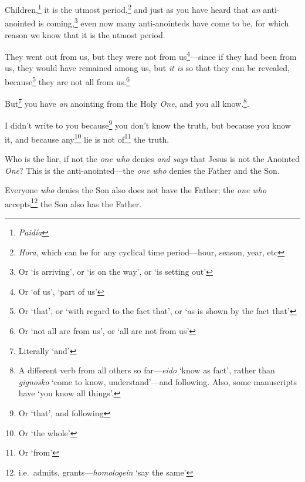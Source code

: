 \documentclass[article]{memoir}%
\newcounter{vnum}
\newcommand{\vnum}{%
	\textsuperscript{\thevnum}%
	\addtocounter{vnum}{1}%
}
\newcommand{\infer}[1]{\textit{#1}}
\newcommand{\lx}[1]{\textit{#1}}
\newcommand{\lxx}[2]{\textit{#1} `#2'}
\begin{document}
\vnum Children,\footnote{\lx{Paidía}} it is the utmost period,\footnote{\lx{Hora}, which can be for any cyclical time period---hour, season, year, etc} and just as you have heard that \infer{an} anti-anointed is coming,\footnote{Or `is arriving', or `is on the way', or `is setting out'} even now many anti-anointeds have come to be, for which reason we know that it is the utmost period. \vnum They went out from us, but they were not from us\footnote{Or `of us', `part of us'}---since if they had been from us, they would have remained among us, but \infer{it is} so that they can be revealed, because\footnote{Or `that', or `with regard to the fact that', or `as is shown by the fact that'} they are not all from us.\footnote{Or `not all are from us', or `all are not from us'} \vnum But\footnote{Literally `and'} you have \infer{an} anointing from the Holy \infer{One}, and you all know.\footnote{A different verb from all others so far---\lxx{eido}{know as fact}, rather than \lxx{gignosko}{come to know, understand}---and following. Also, some manuscripts have `you know all things'.}. \vnum I didn't write to you because\footnote{Or `that', and following} you don't know the truth, but because you know it, and because any\footnote{Or `the whole'} lie is not of\footnote{Or `from'} the truth. \vnum Who is the liar, if not the \infer{one who} denies \infer{and says} that Jesus is not the Anointed \infer{One}? This is the anti-anointed---the \infer{one who} denies the Father and the Son. \vnum Everyone \infer{who} denies the Son also does not have the Father; the \infer{one who} accepts\footnote{i.e.\ admits, grants---\lxx{homologein}{say the same}} the Son also has the Father.
\end{document}
